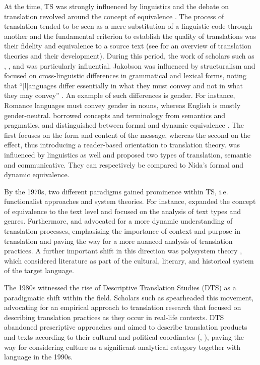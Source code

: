At the time, TS was strongly influenced by linguistics and the debate on translation revolved around the concept of equivalence \citep[59]{munday2022introducing}. The process of translation tended to be seen as a mere substitution of a linguistic code through another and the fundamental criterion to establish the quality of translations was their fidelity and equivalence to a source text (see \cite{pym2017exploring} for an overview of translation theories and their development). During this period, the work of scholars such as \textcite{jakobson1959linguistic}, \textcite{nida1964}, and \textcite{newmark1981} was particularly influential. Jakobson was influenced by structuralism and focused on cross-linguistic differences in grammatical and lexical forms, noting that ``[l]anguages differ essentially in what they must convey and not in what they may convey'' \citep[129]{jakobson1959linguistic}. An example of such differences is gender. For instance, Romance languages must convey gender in nouns, whereas English is mostly gender-neutral. \textcite{nida1964} borrowed concepts and terminology from semantics and pragmatics, and distinguished between formal and dynamic equivalence \citep{munday2022introducing}. The first focuses on the form and content of the message, whereas the second on the effect, thus introducing a reader-based orientation to translation theory. \textcite{newmark1981} was influenced by linguistics as well and proposed two types of translation, semantic and communicative. They can respectively be compared to Nida's formal and dynamic equivalence.

By the 1970s, two different paradigms gained prominence within TS, i.e. functionalist approaches and system theories. For instance, \textcite{reiss1971moglichkeiten} expanded the concept of equivalence to the text level and focused on the analysis of text types and genres. Furthermore, \textcite{reiss1984grundlegung} and \textcite{nord1988} advocated for a more dynamic understanding of translation processes, emphasising the importance of context and purpose in translation and paving the way for a more nuanced analysis of translation practices. A further important shift in this direction was polysystem theory \citep{even-zohar1990}, which considered literature as part of the cultural, literary, and historical system of the target language.

The 1980s witnessed the rise of Descriptive Translation Studies (DTS) as a paradigmatic shift within the field. Scholars such as \textcite{toury1995descriptive} spearheaded this movement, advocating for an empirical approach to translation research that focused on describing translation practices as they occur in real-life contexts. DTS abandoned prescriptive approaches and aimed to describe translation products and texts according to their cultural and political coordinates (\cite{toury1995descriptive}, \cite[64--70]{pym2017exploring}), paving the way for considering culture as a significant analytical category together with language in the 1990s. 

